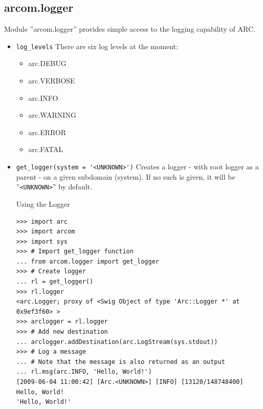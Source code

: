 \documentclass{article}
\begin{document}
\subsection{arcom.logger}
\label{alogger}
Module ''arcom.logger'' provides simple access to the logging capability of ARC.
\begin{flushleft}
\begin{itemize}
  \item{ \verb$log_levels$\newline
  There are six log levels at the moment:
    \begin{itemize}
      \item{arc.DEBUG}
      \item{arc.VERBOSE}
      \item{arc.INFO}
      \item{arc.WARNING}
      \item{arc.ERROR}
      \item{arc.FATAL}
    \end{itemize}
  }
\end{itemize}
\begin{itemize}
  \item{ \verb$get_logger(system = '<UNKNOWN>')$\newline
  Creates a logger - with root logger as a parent - on a given subdomain (system). 
  If no such is given, it will be ''\verb$<UNKNOWN>$'' by default.
    \begin{example}
      \caption{Using the Logger}\label{loggerex}
\begin{verbatim}
>>> import arc
>>> import arcom
>>> import sys
>>> # Import get_logger function
... from arcom.logger import get_logger
>>> # Create logger
... rl = get_logger()
>>> rl.logger
<arc.Logger; proxy of <Swig Object of type 'Arc::Logger *' at 0x9ef3f60> >
>>> arclogger = rl.logger
>>> # Add new destination
... arclogger.addDestination(arc.LogStream(sys.stdout))
>>> # Log a message
... # Note that the message is also returned as an output
... rl.msg(arc.INFO, 'Hello, World!')
[2009-06-04 11:00:42] [Arc.<UNKNOWN>] [INFO] [13120/148748400] Hello, World!
'Hello, World!'
\end{verbatim}
    \end{example}
  }
\end{itemize}
\end{flushleft}
\end{document}
